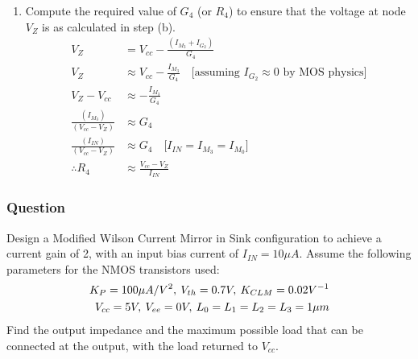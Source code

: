 \begin{enumerate}
    from step (a).
  \item Compute the required value of $G_4$ (or
    $R_4$) to ensure that the voltage at node
    $V_{Z}$ is as calculated in step (b).
    \begin{align*}
      V_{Z} &= V_{cc} - \frac{(I_{M_3} + I_{G_2})}{G_4} \\
      V_{Z} &\approx V_{cc} - \frac{I_{M_3}}{G_4} \quad \text{[assuming } I_{G_2} \approx 0 \text{ by MOS physics]} \\
      V_{Z} - V_{cc} &\approx - \frac{I_{M_3}}{G_4} \\
      \frac{(I_{M_3})}{(V_{cc} - V_{Z})} &\approx G_4 \\
      \frac{(I_{IN})}{(V_{cc} - V_{Z})} &\approx G_4 \quad \text{[} I_{IN} = I_{M_3} = I_{M_0} \text{]} \\
      \therefore R_4 &\approx \frac{V_{cc} - V_{Z}}{I_{IN}}
    \end{align*}
\end{enumerate}

\subsubsection{Question}
Design a Modified Wilson Current Mirror in
Sink configuration to achieve a current gain of
2, with an input bias current of $I_{IN} =
10\mu A$. Assume the following parameters for
the NMOS transistors used:
\begin{align*}
  K_P = 100 \mu A/V^2 ,\: V_{th} = 0.7 V ,\: K_{CLM} = 0.02 V^{-1} \\
  V_{cc} = 5 V ,\: V_{ee} = 0 V ,\: L_0 = L_1 = L_2 = L_3 = 1 \mu m
\end{align*}
Find the output impedance and the maximum
possible load that can be connected at the output,
with the load returned to $V_{cc}$.
